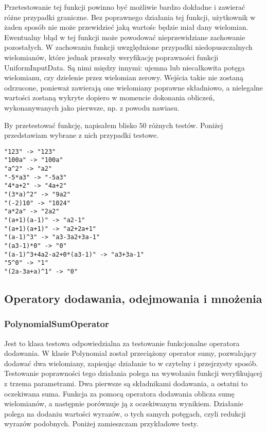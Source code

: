 \documentclass[twoside,a4paper]{book}
\begin{document}
Przetestowanie tej funkcji powinno być możliwie bardzo dokładne i zawierać różne przypadki graniczne. Bez poprawnego działania tej funkcji, użytkownik w żaden sposób nie może przewidzieć jaką wartośc będzie miał dany wielomian. Ewentualny błąd w tej funkcji może powodować nieprzewidziane zachowanie pozostałych. W zachowaniu funkcji uwzględnione przypadki niedopuszczalnych wielomianów, które jednak przeszły weryfikację poprawności funkcji UniformInputData. Są nimi między innymi: ujemna lub niecałkowita potęga wielomianu, czy dzielenie przez wielomian zerowy. Wejścia takie nie zostaną odrzucone, ponieważ zawierają one wielomiany poprawne składniowo, a nielegalne wartości zostaną wykryte dopiero w momencie dokonania obliczeń, wykonanywanych jako pierwsze, np. z powodu nawiasu.

By przetestować funkcję, napisałem blisko $50$ różnych testów. Poniżej przedstawiam wybrane z nich przypadki testowe.

\begin{lstlisting}
"123" -> "123"
"100a" -> "100a"
"a^2" -> "a2"
"-5*a3" -> "-5a3"
"4*a+2" -> "4a+2"
"(3*a)^2" -> "9a2"
"(-2)10" -> "1024"
"a*2a" -> "2a2"
"(a+1)(a-1)" -> "a2-1"
"(a+1)(a+1)" -> "a2+2a+1"
"(a-1)^3" -> "a3-3a2+3a-1"
"(a3-1)*0" -> "0"
"(a-1)^3+4a2-a2+0*(a3-1)" -> "a3+3a-1"
"5^0" -> "1"
"(2a-3a+a)^1" -> "0"
\end{lstlisting}

\subsection{Operatory dodawania, odejmowania i mnożenia}

\subsubsection{PolynomialSumOperator}

Jest to klasa testowa odpowiedzialna za testowanie funkcjonalne operatora dodawania. W klasie Polynomial został przeciążony operator sumy, pozwalający dodawać dwa wielomiany, zapisując działanie to w czytelny i przejrzysty sposób. Testowanie poprawności tego działania polega na wywołaniu funkcji weryfikującej z trzema parametrami. Dwa pierwsze są składnikami dodawania, a ostatni to oczekiwana suma. Funkcja za pomocą operatora dodawania oblicza sumę wielomianów, a następnie porównuje ją z oczekiwanym wynikiem. Działanie polega na dodaniu wartości wyrazów, o tych samych potęgach, czyli redukcji wyrazów podobnych. Poniżej zamieszczam przykładowe testy.
\end{document}
